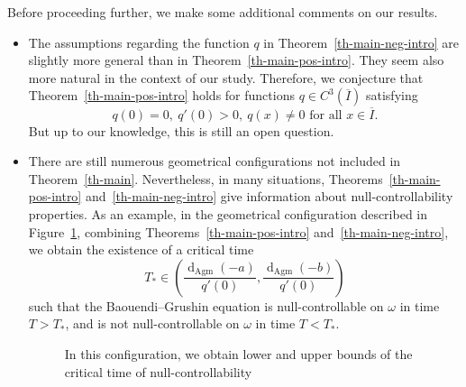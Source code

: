 \documentclass[10pt]{amsart}
\theoremstyle{definition}\newtheorem{defi}[theo]{Definition}\newtheorem{rema}[theo]{Remark}\newtheorem{exam}[theo]{Example}\newtheorem{exem}[theo]{Example}\newtheorem{nota}[theo]{Notation}
\newcommand{\1}{\mathds 1}
\newcommand{\dagmon}{\mathop{\mathrm{d}}\nolimits_{\mathrm{Agm}}}
\renewcommand{\o}{\omega}
\begin{document}
Before proceeding further, we make some additional comments on our results.
\begin{itemize}
\item The assumptions regarding the function $q$ in Theorem~\ref{th-main-neg-intro} are slightly more general than in Theorem~\ref{th-main-pos-intro}. They seem also more natural in the context of our study. Therefore, we conjecture that Theorem~\ref{th-main-pos-intro} holds for functions $q \in C^3(\overline I)$ satisfying
\[
q(0) = 0, \ q'(0) > 0, \ q(x) \neq 0 \text{ for all } x \in \overline{I}.
\]
But up to our knowledge, this is still an open question.
\item There are still numerous geometrical configurations not included in Theorem~\ref{th-main}. Nevertheless, in many situations, Theorems~\ref{th-main-pos-intro} and~\ref{th-main-neg-intro} give information about null-controllability properties. As an example, in the geometrical configuration described in Figure~\ref{fig:example3}, combining Theorems~\ref{th-main-pos-intro} and~\ref{th-main-neg-intro}, we obtain the existence of a critical time
\[
T_* \in \left(\frac {\dagmon(-a)}{q'(0)}, \frac {\dagmon(-b)}{q'(0)} \right)
\]
such that the Baouendi--Grushin equation is null-controllable on $\o$ in time $T>T_*$, and is not null-controllable on $\o $ in time $T< T_*$.

\begin{figure}[ht]
\centering
{}
\caption{In this configuration, we obtain lower and upper bounds of the critical time of null-controllability}\label{fig:example3}
\end{figure}


\end{itemize}
\end{document}
